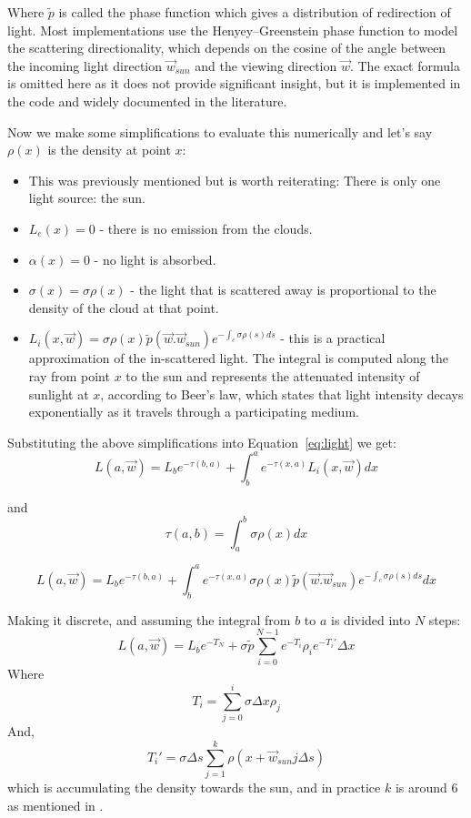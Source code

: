 Where $\tilde{p}$ is called the phase function which gives a distribution of redirection of light. Most implementations use the Henyey–Greenstein phase function to model the scattering directionality, which depends on the cosine of the angle between the incoming light direction $\vec{w}_{sun}$ and the viewing direction $\vec{w}$. The exact formula is omitted here as it does not provide significant insight, but it is implemented in the code and widely documented in the literature.

Now we make some simplifications to evaluate this numerically and let's say $\rho(x)$ is the density at point $x$: \cite{palenik2016volumetricclouds}
\begin{itemize}
\item {This was previously mentioned but is worth reiterating: There is only one light source: the sun.}
\item {$L_e(x) = 0$ - there is no emission from the clouds.}
\item {$\alpha(x) = 0$ - no light is absorbed.}
\item {$\sigma(x) = \sigma\rho(x)$} - the light that is scattered away is proportional to the density of the cloud at that point.
\item {$L_i(x, \vec{w}) = \sigma\rho(x)\tilde{p}(\vec{w}.\vec{w}_{sun})e^{-\int_c{\sigma\rho(s)ds}}$} - this is a practical approximation of the in-scattered light. The integral is computed along the ray from point $x$ to the sun and represents the attenuated intensity of sunlight at $x$, according to Beer's law, which states that light intensity decays exponentially as it travels through a participating medium. 
\end{itemize}

Substituting the above simplifications into Equation~\ref{eq:light} we get:
\[
L(a, \vec{w}) = L_be^{-\tau(b, a)} + \int_b^a{e^{-\tau(x, a)}L_i(x, \vec{w})dx}
\]

and 
\[
\tau(a, b) = \int_a^b{\sigma\rho(x)dx}
\]

\[
L(a, \vec{w}) = L_be^{-\tau(b, a)} + \int_b^a{e^{-\tau(x, a)}\sigma\rho(x)\tilde{p}(\vec{w}.\vec{w}_{sun})
e^{-\int_c{\sigma\rho(s)ds}} dx}
\]

Making it discrete, and assuming the integral from $b$ to $a$ is divided into $N$ steps:
\[
L(a, \vec{w}) = L_be^{-T_N} + \sigma\tilde{p}\sum_{i=0}^{N-1}
e^{-T_i}\rho_ie^{-T_i'}\Delta{x}
\]
Where 
\[
T_i = \sum_{j=0}^{i}\sigma\Delta{x}\rho_j
\]
And, 
\[
T_i' = \sigma\Delta{s}\sum_{j=1}^{k}\rho(x + \vec{w}_{sun}j\Delta{s})
\]
which is accumulating the density towards the sun, and in practice $k$ is around 6 as mentioned in \cite{guerrillagames2025nubis}.

